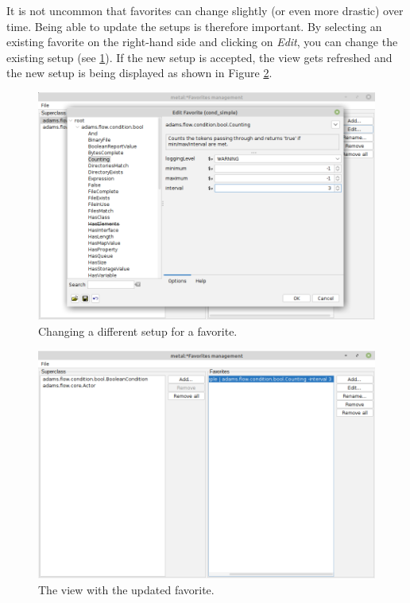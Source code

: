 \clearpage
{}
It is not uncommon that favorites can change slightly (or even more drastic)
over time. Being able to update the setups is therefore important. By selecting
an existing favorite on the right-hand side and clicking on \textit{Edit}, you
can change the existing setup (see \ref{favoritesmanagement-edit1}). If the
new setup is accepted, the view gets refreshed and the new setup is being
displayed as shown in Figure \ref{favoritesmanagement-edit2}.

\begin{figure}[htb]
  \centering
  \includegraphics[width=12.0cm]{images/favoritesmanagement-edit1.png}
  \caption{Changing a different setup for a favorite.}
  \label{favoritesmanagement-edit1}
\end{figure}

\begin{figure}[htb]
  \centering
  \includegraphics[width=12.0cm]{images/favoritesmanagement-edit2.png}
  \caption{The view with the updated favorite.}
  \label{favoritesmanagement-edit2}
\end{figure}

